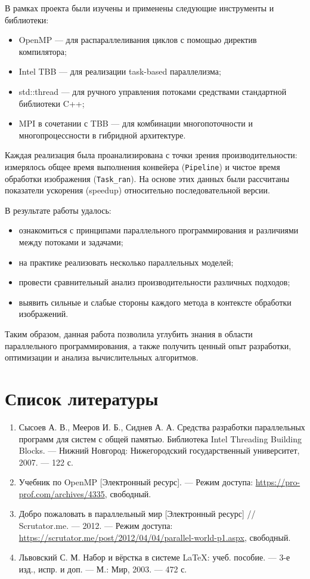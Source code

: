 \documentclass{report}
\begin{document}
В рамках проекта были изучены и применены следующие инструменты и библиотеки:
\begin{itemize}
    \item OpenMP — для распараллеливания циклов с помощью директив компилятора;
    \item Intel TBB — для реализации task-based параллелизма;
    \item std::thread — для ручного управления потоками средствами стандартной библиотеки C++;
    \item MPI в сочетании с TBB — для комбинации многопоточности и многопроцессности в гибридной архитектуре.
\end{itemize}

Каждая реализация была проанализирована с точки зрения производительности: измерялось общее время выполнения конвейера (\texttt{Pipeline}) и чистое время обработки изображения (\texttt{Task\_ran}). На основе этих данных были рассчитаны показатели ускорения (speedup) относительно последовательной версии.

В результате работы удалось:
\begin{itemize}
    \item ознакомиться с принципами параллельного программирования и различиями между потоками и задачами;
    \item на практике реализовать несколько параллельных моделей;
    \item провести сравнительный анализ производительности различных подходов;
    \item выявить сильные и слабые стороны каждого метода в контексте обработки изображений.
\end{itemize}

Таким образом, данная работа позволила углубить знания в области параллельного программирования, а также получить ценный опыт разработки, оптимизации и анализа вычислительных алгоритмов.


\newpage
\section*{Список литературы}
\begin{enumerate}
    \item Сысоев А. В., Мееров И. Б., Сиднев А. А. Средства разработки параллельных программ для систем с общей памятью. Библиотека Intel Threading Building Blocks. — Нижний Новгород: Нижегородский государственный университет, 2007. — 122 с.

    \item Учебник по OpenMP [Электронный ресурс]. — Режим доступа: \url{https://pro-prof.com/archives/4335}, свободный. 

    \item Добро пожаловать в параллельный мир [Электронный ресурс] // Scrutator.me. — 2012. — Режим доступа: \url{https://scrutator.me/post/2012/04/04/parallel-world-p1.aspx}, свободный. 

    \item Львовский С. М. Набор и вёрстка в системе LaTeX: учеб. пособие. — 3-е изд., испр. и доп. — М.: Мир, 2003. — 472 с.
\end{enumerate}
\end{document}
